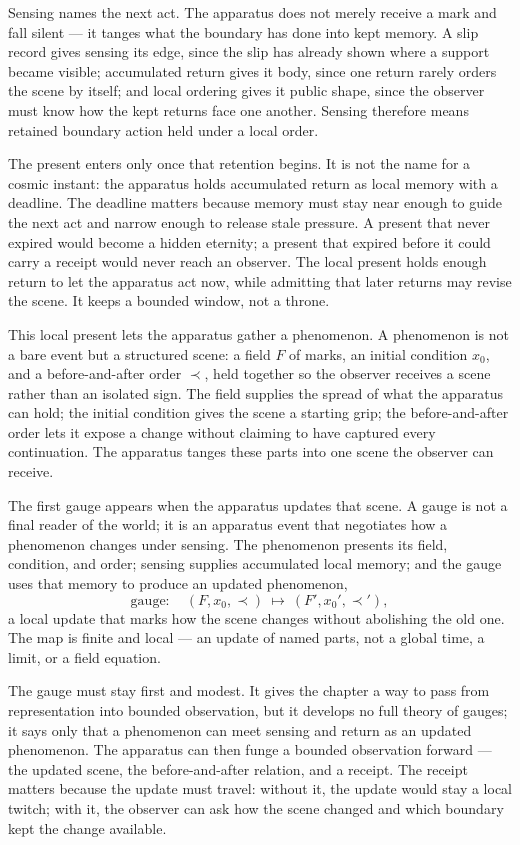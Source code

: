 Sensing names the next act. The apparatus does not merely receive a mark and fall silent --- it tanges what the boundary has done into kept memory. A slip record gives sensing its edge, since the slip has already shown where a support became visible; accumulated return gives it body, since one return rarely orders the scene by itself; and local ordering gives it public shape, since the observer must know how the kept returns face one another. Sensing therefore means retained boundary action held under a local order.

The present enters only once that retention begins. It is not the name for a cosmic instant: the apparatus holds accumulated return as local memory with a deadline. The deadline matters because memory must stay near enough to guide the next act and narrow enough to release stale pressure. A present that never expired would become a hidden eternity; a present that expired before it could carry a receipt would never reach an observer. The local present holds enough return to let the apparatus act now, while admitting that later returns may revise the scene. It keeps a bounded window, not a throne.

This local present lets the apparatus gather a phenomenon. A phenomenon is not a bare event but a structured scene: a field $F$ of marks, an initial condition $x_0$, and a before-and-after order $\prec$, held together so the observer receives a scene rather than an isolated sign. The field supplies the spread of what the apparatus can hold; the initial condition gives the scene a starting grip; the before-and-after order lets it expose a change without claiming to have captured every continuation. The apparatus tanges these parts into one scene the observer can receive.

The first gauge appears when the apparatus updates that scene. A gauge is not a final reader of the world; it is an apparatus event that negotiates how a phenomenon changes under sensing. The phenomenon presents its field, condition, and order; sensing supplies accumulated local memory; and the gauge uses that memory to produce an updated phenomenon,
\[ \mathrm{gauge}:\quad (F, x_0, \prec) \ \longmapsto\ (F', x_0', \prec'), \]
a local update that marks how the scene changes without abolishing the old one. The map is finite and local --- an update of named parts, not a global time, a limit, or a field equation.

The gauge must stay first and modest. It gives the chapter a way to pass from representation into bounded observation, but it develops no full theory of gauges; it says only that a phenomenon can meet sensing and return as an updated phenomenon. The apparatus can then funge a bounded observation forward --- the updated scene, the before-and-after relation, and a receipt. The receipt matters because the update must travel: without it, the update would stay a local twitch; with it, the observer can ask how the scene changed and which boundary kept the change available.

